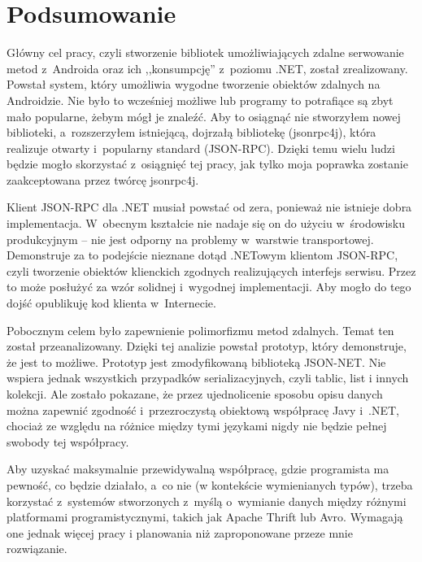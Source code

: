 \chapter{Podsumowanie}
Główny cel pracy, czyli stworzenie bibliotek umożliwiających zdalne serwowanie metod z~Androida oraz ich ,,konsumpcję'' z~poziomu .NET, został zrealizowany.
Powstał system, który umożliwia wygodne tworzenie obiektów zdalnych na Androidzie. Nie było to wcześniej możliwe lub programy to potrafiące są zbyt mało popularne, żebym mógł je znaleźć.
Aby to osiągnąć nie stworzyłem nowej biblioteki, a~rozszerzyłem istniejącą, dojrzałą bibliotekę (jsonrpc4j), która realizuje otwarty i~popularny standard (JSON-RPC).
Dzięki temu wielu ludzi będzie mogło skorzystać z~osiągnięć tej pracy, jak tylko moja poprawka zostanie zaakceptowana przez twórcę jsonrpc4j.

Klient JSON-RPC dla .NET musiał powstać od zera, ponieważ nie istnieje dobra implementacja.
W~obecnym kształcie nie nadaje się on do użyciu w~środowisku produkcyjnym -- nie jest odporny na problemy w~warstwie transportowej.
Demonstruje za to podejście nieznane dotąd .NETowym klientom JSON-RPC, czyli tworzenie obiektów klienckich zgodnych realizujących interfejs serwisu.
Przez to może posłużyć za wzór solidnej i~wygodnej implementacji.
Aby mogło do tego dojść opublikuję kod klienta w~Internecie.

Pobocznym celem było zapewnienie polimorfizmu metod zdalnych.
Temat ten został przeanalizowany. Dzięki tej analizie powstał prototyp, który demonstruje, że jest to możliwe. Prototyp jest zmodyfikowaną biblioteką JSON-NET.
Nie wspiera jednak wszystkich przypadków serializacyjnych, czyli tablic, list i innych kolekcji.
Ale zostało pokazane, że przez ujednolicenie sposobu opisu danych można zapewnić zgodność i~przezroczystą obiektową współpracę Javy i~.NET, chociaż ze względu na różnice między tymi językami nigdy nie będzie pełnej swobody tej współpracy.

Aby uzyskać maksymalnie przewidywalną współpracę, gdzie programista ma pewność, co będzie działało, a~co nie (w kontekście wymienianych typów), trzeba korzystać z~systemów stworzonych z~myślą o~wymianie danych między różnymi platformami programistycznymi, takich jak Apache Thrift lub Avro.
Wymagają one jednak więcej pracy i planowania niż zaproponowane przeze mnie rozwiązanie.



